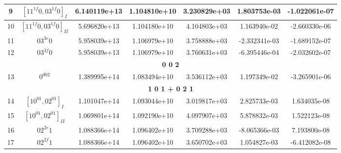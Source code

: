 \begin{table}[h!]
\begin{tabular}{|c|c|c|c|c|c|c|}
9 & $[11^{1f}0, 03^{1f}0]_{I}$ & 6.140119e+13 & 1.104810e+10 & 3.230829e+03 & 1.803753e-03 & -1.022061e-07 \\ \hline
10 & $[11^{1f}0, 03^{1f}0]_{II}$ & 5.696820e+13 & 1.104180e+10 & 4.104803e+03 & 1.163940e-02 & -2.660330e-06 \\ \hline
11 & $03^{3e}0$ & 5.958039e+13 & 1.106979e+10 & 3.758888e+03 & -2.332341e-03 & -1.689152e-07 \\ \hline
12 & $03^{3f}0$ & 5.958039e+13 & 1.106979e+10 & 3.760631e+03 & -6.395446e-04 & -2.032602e-07 \\ \hline
\multicolumn{7}{|c|}{\textbf{0 0 2}} \\ \hline
13 & $0^002$ & 1.389995e+14 & 1.083494e+10 & 3.536112e+03 & 1.197349e-02 & -3.265901e-06 \\ \hline
\multicolumn{7}{|c|}{\textbf{1 0 1 + 0 2 1}} \\ \hline
14 & $[10^01, 02^01]_{I}$ & 1.101047e+14 & 1.093044e+10 & 3.019817e+03 & 2.825733e-03 & 1.634035e-08 \\ \hline
15 & $[10^01, 02^01]_{II}$ & 1.069801e+14 & 1.092190e+10 & 4.097907e+03 & 5.878832e-03 & 1.522123e-08 \\ \hline
16 & $02^{2e}1$ & 1.088366e+14 & 1.096402e+10 & 3.709288e+03 & -8.065366e-03 & 7.193800e-08 \\ \hline
17 & $02^{2f}1$ & 1.088366e+14 & 1.096402e+10 & 3.650702e+03 & 1.054827e-03 & -6.412082e-08 \\ \hline
\end{tabular}
\end{table}


